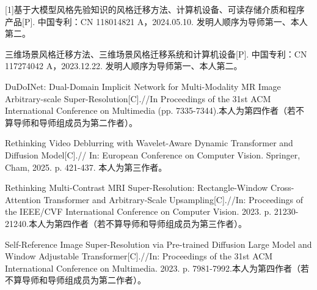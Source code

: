 \cleardoublepage
{}
[1]基于大模型风格先验知识的风格迁移方法、计算机设备、可读存储介质和程序产品[P]. 中国专利：CN 118014821 A，2024.05.10. 发明人顺序为导师第一、本人第二。
\par [2]三维场景风格迁移方法、三维场景风格迁移系统和计算机设备[P]. 中国专利：CN 117274042 A，2023.12.22. 发明人顺序为导师第一、本人第二。
\par [3]DuDoINet: Dual-Domain Implicit Network for Multi-Modality MR Image Arbitrary-scale Super-Resolution[C].//In Proceedings of the 31st ACM International Conference on Multimedia (pp. 7335-7344).本人为第四作者（若不算导师和导师组成员为第二作者）。
\par [4]Rethinking Video Deblurring with Wavelet-Aware Dynamic Transformer and Diffusion Model[C].// In: European Conference on Computer Vision. Springer, Cham, 2025. p. 421-437. 本人为第三作者。
\par [5]Rethinking Multi-Contrast MRI Super-Resolution: Rectangle-Window Cross-Attention Transformer and Arbitrary-Scale Upsampling[C].//In: Proceedings of the IEEE/CVF International Conference on Computer Vision. 2023. p. 21230-21240.本人为第四作者（若不算导师和导师组成员为第三作者）。
\par [6]Self-Reference Image Super-Resolution via Pre-trained Diffusion Large Model and Window Adjustable Transformer[C].//In: Proceedings of the 31st ACM International Conference on Multimedia. 2023. p. 7981-7992.本人为第四作者（若不算导师和导师组成员为第二作者）。